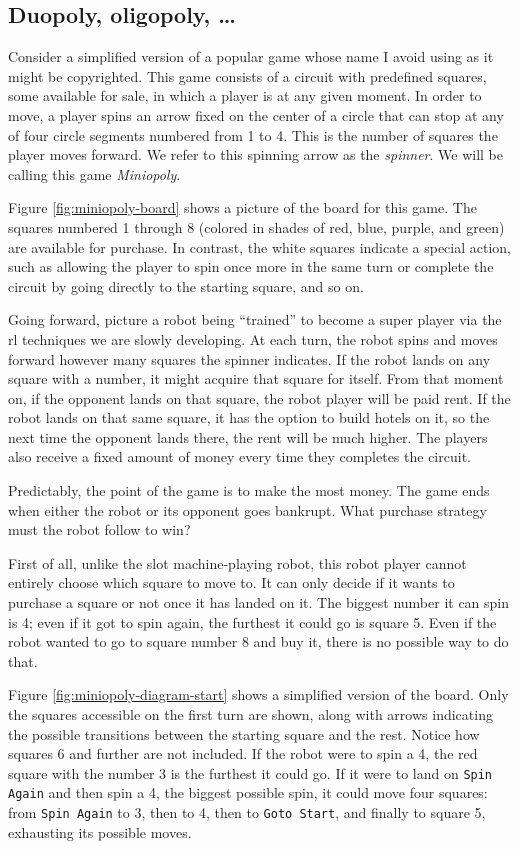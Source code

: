 \subsection{Duopoly, oligopoly, \ldots}

Consider a simplified version of a popular game whose name I avoid using as it
might be copyrighted. This game consists of a circuit with predefined squares,
some available for sale, in which a player is at any given moment. In order to
move, a player spins an arrow fixed on the center of a circle that can stop at
any of four circle segments numbered from 1 to 4. This is the number of squares
the player moves forward. We refer to this spinning arrow as the
\textit{spinner}. We will be calling this game \emph{Miniopoly}.

Figure \ref{fig:miniopoly-board} shows a picture of the board for this game. The
squares numbered 1 through 8 (colored in shades of red, blue, purple, and green)
are available for purchase. In contrast, the white squares indicate a special
action, such as allowing the player to spin once more in the same turn or
complete the circuit by going directly to the starting square, and so on.

Going forward, picture a robot being ``trained'' to become a super player via
the \ac{rl} techniques we are slowly developing. At each turn, the robot spins
and moves forward however many squares the spinner indicates. If the robot lands
on any square with a number, it might acquire that square for itself. From that
moment on, if the opponent lands on that square, the robot player will be paid
rent. If the robot lands on that same square, it has the option to build hotels
on it, so the next time the opponent lands there, the rent will be much higher.
The players also receive a fixed amount of money every time they completes the
circuit.

Predictably, the point of the game is to make the most money. The game ends when
either the robot or its opponent goes bankrupt. What purchase strategy must the
robot follow to win?

First of all, unlike the slot machine-playing robot, this robot player cannot
entirely choose which square to move to. It can only decide if it wants to
purchase a square or not once it has landed on it. The biggest number it can
spin is 4; even if it got to spin again, the furthest it could go is square 5.
Even if the robot wanted to go to square number 8 and buy it, there is no
possible way to do that.

Figure \ref{fig:miniopoly-diagram-start} shows a simplified version of the
board. Only the squares accessible on the first turn are shown, along with
arrows indicating the possible transitions between the starting square and the
rest. Notice how squares 6 and further are not included. If the robot were to
spin a 4, the red square with the number 3 is the furthest it could go. If it
were to land on \texttt{Spin Again} and then spin a 4, the biggest possible
spin, it could move four squares: from \texttt{Spin Again} to 3, then to 4, then
to \texttt{Goto Start}, and finally to square 5, exhausting its possible moves.

